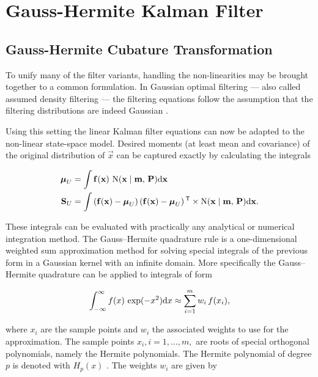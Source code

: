 \section{Gauss-Hermite Kalman Filter}
%

\subsection{Gauss-Hermite Cubature Transformation}

To unify many of the filter variants, handling the non-linearities may be brought together to a common formulation. In Gaussian optimal filtering --- also called assumed density filtering --- the filtering equations follow the assumption that the filtering distributions are indeed Gaussian \citep{Maybeck:1982, Ito+Xiong:2000}. %

Using this setting the linear Kalman filter equations can now be adapted to the non-linear state-space model. Desired moments (at least mean and covariance) of the original distribution of $\vec{x}$ can be captured exactly by calculating the integrals

\begin{align}%
\begin{split} \label{eqCh2integral1}
    \bmu_U &= \int \vec{f}(\vec{x})\,\N(\vec{x} \mid \vec{m},\,\vec{P}) \diff \vec{x} \\
    \vec{S}_U &= \int \left(\vec{f}(\vec{x}) - \bmu_U\right) \left(\vec{f}(\vec{x}) - \bmu_U\right)\T 
     \times \N(\vec{x} \mid \vec{m},\,\vec{P}) \diff \vec{x}.
\end{split}%
\end{align}

These integrals can be evaluated with practically any analytical or numerical integration method. The Gauss--Hermite quadrature rule is a one-dimensional weighted sum approximation method for solving special integrals of the previous form in a Gaussian kernel with an infinite domain. More specifically the Gauss--Hermite quadrature can be applied to integrals of form

\begin{equation} \label{eqGaussHermite1D}
    \int_{-\infty}^\infty f(x)\,\exp(-x^2) \mathrm{d} x \approx \sum_{i=1}^m w_i\,f(x_i),
\end{equation}

\noindent%
where $x_i$ are the sample points and $w_i$ the associated weights to use for the approximation. The sample points $x_i, i=1,\ldots,m,$ are roots of special orthogonal polynomials, namely the Hermite polynomials. The Hermite polynomial of degree $p$ is denoted with $H_p(x)$ \citep[see][for details]{Abramowitz+Stegun:1964}. The weights $w_i$ are given by

